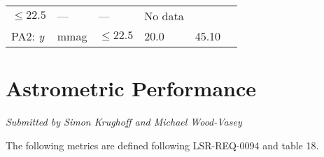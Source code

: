 \documentclass[DM,toc]{lsstdoc}
\begin{document}
\begin{longtable}[]{@{}llllll@{}}
\begin{minipage}[t]{0.17\columnwidth}
\(\leq 22.5\)\strut
\end{minipage} & \begin{minipage}[t]{0.17\columnwidth}\raggedright\strut
---\strut
\end{minipage} & \begin{minipage}[t]{0.12\columnwidth}\raggedright\strut
---\strut
\end{minipage} & \begin{minipage}[t]{0.17\columnwidth}\raggedright\strut
No data\strut
\end{minipage}\tabularnewline
\begin{minipage}[t]{0.14\columnwidth}\raggedright\strut
PA2: \emph{y}\strut
\end{minipage} & \begin{minipage}[t]{0.06\columnwidth}\raggedright\strut
mmag\strut
\end{minipage} & \begin{minipage}[t]{0.17\columnwidth}\raggedright\strut
\(\leq 22.5\)\strut
\end{minipage} & \begin{minipage}[t]{0.17\columnwidth}\raggedright\strut
20.0\strut
\end{minipage} & \begin{minipage}[t]{0.12\columnwidth}\raggedright\strut
45.10\strut
\end{minipage} & \begin{minipage}[t]{0.17\columnwidth}\raggedright\strut
\strut
\end{minipage}\tabularnewline
\bottomrule
\end{longtable}

\section{Astrometric Performance}\label{astrometric-performance}

\emph{Submitted by Simon Krughoff and Michael Wood-Vasey}

The following metrics are defined following LSR-REQ-0094
 and  table 18.
\end{document}
